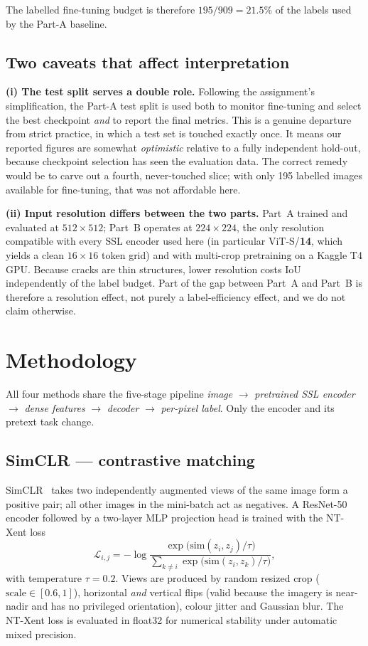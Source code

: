 \documentclass[conference]{IEEEtran}
\begin{document}
The labelled fine-tuning budget is therefore $195/909 = 21.5\%$ of the labels used by
the Part-A baseline.

\subsection{Two caveats that affect interpretation}

\textbf{(i) The test split serves a double role.} Following the assignment's
simplification, the Part-A test split is used both to monitor fine-tuning and select
the best checkpoint \emph{and} to report the final metrics. This is a genuine
departure from strict practice, in which a test set is touched exactly once. It
means our reported figures are somewhat \emph{optimistic} relative to a fully
independent hold-out, because checkpoint selection has seen the evaluation data. The
correct remedy would be to carve out a fourth, never-touched slice; with only 195
labelled images available for fine-tuning, that was not affordable here.

\textbf{(ii) Input resolution differs between the two parts.} Part~A trained and
evaluated at $512\times512$; Part~B operates at $224\times224$, the only resolution
compatible with every SSL encoder used here (in particular ViT-S/\textbf{14}, which
yields a clean $16\times16$ token grid) and with multi-crop pretraining on a Kaggle
T4 GPU. Because cracks are thin structures, lower resolution costs IoU independently
of the label budget. Part of the gap between Part~A and Part~B is therefore a
resolution effect, not purely a label-efficiency effect, and we do not claim
otherwise.

\section{Methodology}

All four methods share the five-stage pipeline
\emph{image} $\rightarrow$ \emph{pretrained SSL encoder} $\rightarrow$ \emph{dense
features} $\rightarrow$ \emph{decoder} $\rightarrow$ \emph{per-pixel label}.
Only the encoder and its pretext task change.

\subsection{SimCLR --- contrastive matching}
SimCLR~\cite{simclr} takes two independently augmented views of the same image form a positive pair; all other
images in the mini-batch act as negatives. A ResNet-50 encoder followed by a
two-layer MLP projection head is trained with the NT-Xent loss
\begin{equation}
\mathcal{L}_{i,j} = -\log
\frac{\exp\!\big(\mathrm{sim}(z_i,z_j)/\tau\big)}
     {\sum_{k\neq i}\exp\!\big(\mathrm{sim}(z_i,z_k)/\tau\big)},
\end{equation}
with temperature $\tau=0.2$. Views are produced by random resized crop
($\mathrm{scale}\in[0.6,1]$), horizontal \emph{and} vertical flips (valid because the
imagery is near-nadir and has no privileged orientation), colour jitter and Gaussian
blur. The NT-Xent loss is evaluated in float32 for numerical stability under
automatic mixed precision.
\end{document}
